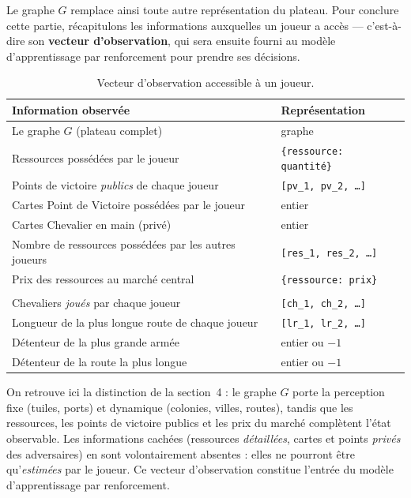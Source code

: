 \documentclass[11pt,a4paper]{article}
\begin{document}
Le graphe $G$ remplace ainsi toute autre représentation du plateau. Pour conclure cette
partie, récapitulons les informations auxquelles un joueur a accès — c'est-à-dire son
\textbf{vecteur d'observation}, qui sera ensuite fourni au modèle d'apprentissage par
renforcement pour prendre ses décisions.

\begin{table}[h]
\centering
\renewcommand{\arraystretch}{1.35}
\begin{tabular}{>{\raggedright\arraybackslash}p{8.0cm} l}
\toprule
\textbf{Information observée} & \textbf{Représentation} \\
\midrule
Le graphe $G$ (plateau complet) & graphe \\
Ressources possédées par le joueur &
  \texttt{\{ressource: quantité\}} \\
Points de victoire \emph{publics} de chaque joueur &
  \texttt{[pv\_1, pv\_2, \dots]} \\
Cartes Point de Victoire possédées par le joueur &
  entier \\
Cartes Chevalier en main (privé) &
  entier \\
Nombre de ressources possédées par les autres joueurs &
  \texttt{[res\_1, res\_2, \dots]} \\
Prix des ressources au marché central &
  \texttt{\{ressource: prix\}} \\
\addlinespace[2pt]
\midrule
\multicolumn{2}{l}{\textit{Informations publiques pré-calculées}} \\
\midrule
Chevaliers \emph{joués} par chaque joueur &
  \texttt{[ch\_1, ch\_2, \dots]} \\
Longueur de la plus longue route de chaque joueur &
  \texttt{[lr\_1, lr\_2, \dots]} \\
Détenteur de la plus grande armée &
  entier ou $-1$ \\
Détenteur de la route la plus longue &
  entier ou $-1$ \\
\bottomrule
\end{tabular}
\caption{Vecteur d'observation accessible à un joueur.}
\end{table}

\noindent
On retrouve ici la distinction de la section~4 : le graphe $G$ porte la perception
fixe (tuiles, ports) et dynamique (colonies, villes, routes), tandis que les
ressources, les points de victoire publics et les prix du marché complètent l'état
observable. Les informations cachées (ressources \emph{détaillées}, cartes et points
\emph{privés} des adversaires) en sont volontairement absentes : elles ne pourront être
qu'\emph{estimées} par le joueur. Ce vecteur d'observation constitue l'entrée du modèle
d'apprentissage par renforcement.
\end{document}
